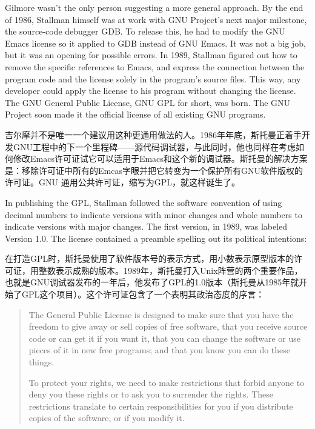 \ifdefined\eng
Gilmore wasn't the only person suggesting a more general approach. By the end of 1986, Stallman himself was at work with GNU Project's next major milestone, the source-code debugger GDB.  To release this, he had to modify the GNU Emacs license so it applied to GDB instead of GNU Emacs.  It was not a big job, but it was an opening for possible errors.  In 1989, Stallman figured out how to remove the specific references to Emacs, and express the connection between the program code and the license solely in the program's source files.  This way, any developer could apply the license to his program without changing the license. The GNU General Public License, GNU GPL for short, was born.  The GNU Project soon made it the official license of all existing GNU programs.
\fi

\ifdefined\chs
吉尔摩并不是唯一一个建议用这种更通用做法的人。1986年年底，斯托曼正着手开发GNU工程中的下一个里程碑——源代码调试器，与此同时，他也同样在考虑如何修改Emacs许可证试它可以适用于Emacs和这个新的调试器。斯托曼的解决方案是：移除许可证中所有的Emcas字眼并把它转变为一个保护所有GNU软件版权的许可证。GNU 通用公共许可证，缩写为GPL，就这样诞生了。
\fi

\ifdefined\eng
In publishing the GPL, Stallman followed the software convention of using decimal numbers to indicate versions with minor changes and whole numbers to indicate versions with major changes. The first version, in 1989, was labeled Version 1.0. The license contained a preamble spelling out its political intentions:
\fi

\ifdefined\chs
在打造GPL时，斯托曼使用了软件版本号的表示方式，用小数表示原型版本的许可证，用整数表示成熟的版本。1989年，斯托曼打入Unix阵营的两个重要作品，也就是GNU调试器发布的一年后，他发布了GPL的1.0版本（斯托曼从1985年就开始了GPL这个项目）。这个许可证包含了一个表明其政治态度的序言：
\fi

\ifdefined\eng
\begin{quote}
The General Public License is designed to make sure that you have the freedom to give away or sell copies of free software, that you receive source code or can get it if you want it, that you can change the software or use pieces of it in new free programs; and that you know you can do these things.

To protect your rights, we need to make restrictions that forbid anyone to deny you these rights or to ask you to surrender the rights. These restrictions translate to certain responsibilities for you if you distribute copies of the software, or if you modify it.
\end{quote}
\fi

